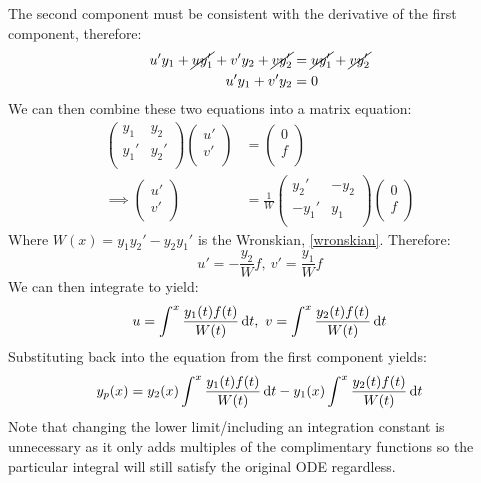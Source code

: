 \documentclass[../main.tex]{subfiles}
\begin{document}
The second component must be consistent with the derivative of the first component, therefore:
\begin{align*}
  u'y_1 + \cancel{uy_1'} + v'y_2 + \cancel{vy_2'} &= \cancel{uy_1'} + \cancel{vy_2'} \\
  u' y_1 + v' y_2 &= 0
\end{align*}
We can then combine these two equations into a matrix equation:
\begin{align*}
  \begin{pmatrix}
  y_1 & y_2 \\
  y_1' & y_2' \\
  \end{pmatrix}
  \begin{pmatrix}
  u' \\
  v' \\
  \end{pmatrix}&=
  \begin{pmatrix}
  0 \\
  f \\
  \end{pmatrix}\\\implies
  \begin{pmatrix}
  u' \\
  v' \\
  \end{pmatrix}&=
  \frac{1}{W}
  \begin{pmatrix}
  y_2' & -y_2 \\
  -y_1' & y_1 \\
  \end{pmatrix}
  \begin{pmatrix}
  0 \\
  f \\
  \end{pmatrix}
\end{align*}
Where $W(x) = y_1 y_2' - y_2 y_1'$ is the Wronskian, \cref{wronskian}.
Therefore:
\[
  u' = - \frac{y_2}{W}f,\ v' = \frac{y_1}{W}f
\]
We can then integrate to yield:
\[
  u = \int^{x} \frac{y_1(t)f(t)}{W(t)} \d{t},\ v = \int^{x} \frac{y_2(t)f(t)}{W(t)} \d{t}
\]
Substituting back into the equation from the first component yields:
\[
  y_p(x) = y_2(x)\int^{x} \frac{y_1(t)f(t)}{W(t)} \d{t} - y_1(x) \int^{x} \frac{y_2(t)f(t)}{W(t)} \d{t}
\]
Note that changing the lower limit/including an integration constant is unnecessary as it only adds multiples of the complimentary functions so the particular integral will still satisfy the original ODE regardless.
\end{document}
